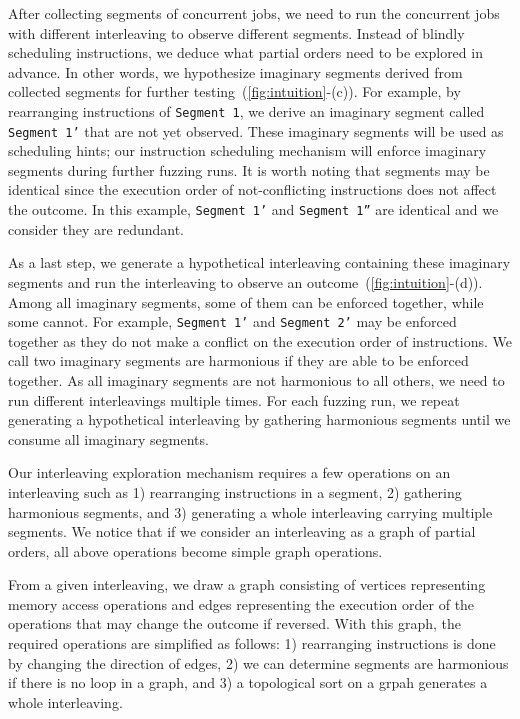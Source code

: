 After collecting segments of concurrent jobs, we need to run the
concurrent jobs with different interleaving to observe different
segments.
%
Instead of blindly scheduling instructions, we deduce what partial
orders need to be explored in advance.
%
In other words, we hypothesize imaginary segments derived from
collected segments for further testing~(\autoref{fig:intuition}-(c)).
%
For example, by rearranging instructions of \texttt{Segment 1}, we
derive an imaginary segment called \texttt{Segment 1'} that are not
yet observed.
%
These imaginary segments will be used as scheduling hints; our
instruction scheduling mechanism will enforce imaginary segments
during further fuzzing runs.
%
It is worth noting that segments may be identical since the execution
order of not-conflicting instructions does not affect the outcome.
%
In this example, \texttt{Segment 1'} and \texttt{Segment 1''} are
identical and we consider they are redundant.

As a last step, we generate a hypothetical interleaving containing
these imaginary segments and run the interleaving to observe an
outcome~(\autoref{fig:intuition}-(d)).
%
Among all imaginary segments, some of them can be enforced together,
while some cannot.  For example, \texttt{Segment 1'} and
\texttt{Segment 2'} may be enforced together as they do not make a
conflict on the execution order of instructions.
%
We call two imaginary segments are harmonious if they are able to be
enforced together.
%
As all imaginary segments are not harmonious to all others, we need to
run different interleavings multiple times. For each fuzzing run, we
repeat generating a hypothetical interleaving by gathering harmonious
segments until we consume all imaginary segments.

%
Our interleaving exploration mechanism requires a few operations on an
interleaving such as 1) rearranging instructions in a segment, 2)
gathering harmonious segments, and 3) generating a whole interleaving
carrying multiple segments.
%
We notice that if we consider an interleaving as a graph of partial
orders, all above operations become simple graph operations.

From a given interleaving, we draw a graph consisting of vertices
representing memory access operations and edges representing the
execution order of the operations that may change the outcome if
reversed.
%
With this graph, the required operations are simplified as follows: 1)
rearranging instructions is done by changing the direction of edges,
2) we can determine segments are harmonious if there is no loop in a
graph, and 3) a topological sort on a grpah generates a whole
interleaving.



